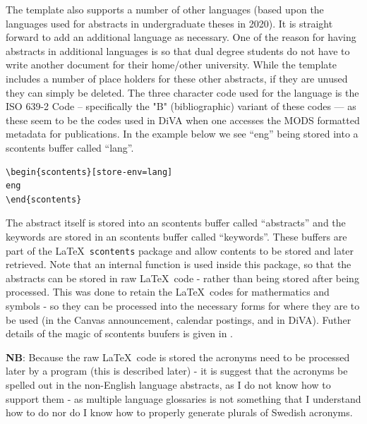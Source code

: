 The template also supports a number of other languages (based upon the languages used for abstracts in undergraduate theses in 2020). It is straight forward to add an additional language as necessary. One of the reason for having abstracts in additional languages is so that dual degree students do not have to write another document for their home/other university. While the template includes a number of place holders for these other abstracts, if they are unused they can simply be deleted.
The three character code used for the language is the ISO 639-2 Code – specifically the "B" (bibliographic) variant of these codes --- as these seem to be the codes used in DiVA when one accesses the MODS formatted metadata for publications. In the example below we see “eng” being stored into a scontents buffer called “lang”.
\begin{lstlisting}[language={[LaTeX]TeX}, caption={Storing the language in a scontents buffer named "lang"}, label=lst:EnglishAbstractLang] 
\begin{scontents}[store-env=lang]
eng
\end{scontents}
\end{lstlisting}

The abstract itself is stored into an scontents buffer called “abstracts” and the keywords are stored in an scontents buffer called “keywords”.  These buffers are part of the \LaTeX~\texttt{scontents} package and allow contents to be stored and later retrieved. Note that an internal function is used inside this package, so that the abstracts can be stored in raw \LaTeX~code - rather than being stored after being processed. This was done to retain the \LaTeX~codes for mathermatics and symbols - so they can be processed into the necessary forms for where they are to be used (\ie in the Canvas announcement, calendar postings, and in DiVA). Futher details of the magic of scontents buufers is given in .

\textbf{NB}: Because the raw \LaTeX~code is stored the acronyms need to be processed later by a program (this is described later) - it is suggest that the acronyms be spelled out in the non-English language abstracts, as I do not know how to support them - as multiple language glossaries is not something that I understand how to do nor do I know how to properly generate plurals of Swedish acronyms.

